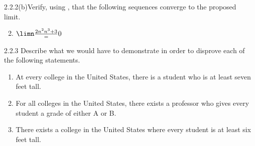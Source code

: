 \begin{exercise}
    {2.2.2(b)}Verify, using , that
    the following sequences converge to the proposed limit.
    \begin{enumerate}
        \setcounter{enumi}{1}
        \item \(\limn \frac{2n^2{n^3+3}} = 0\)
    \end{enumerate}
\end{exercise}


\begin{exercise}
    {2.2.3} Describe what we would have to demonstrate in order to disprove each of the following statements.
    \begin{enumerate}
        \item At every college in the United States, there is a student who is at least
              seven feet tall.
        \item For all colleges in the United States, there exists a professor who gives every student a grade of either A or B.
        \item There exists a college in the United States where every student is at least six feet tall.
    \end{enumerate}
\end{exercise}


